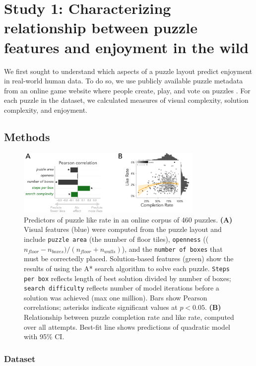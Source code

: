 \documentclass[10pt,letterpaper]{article}
\begin{document}
\section{Study 1: Characterizing relationship between puzzle features and enjoyment in the wild}
We first sought to understand which aspects of a puzzle layout predict enjoyment in real-world human data. To do so, we use publicly available puzzle metadata from an online game website where people create, play, and vote on puzzles \cite{sokobanonline}. For each puzzle in the dataset, we calculated measures of visual complexity, solution complexity, and enjoyment. 

\subsection{Methods}

\begin{figure}[ht]
    \centering
    \includegraphics[width=0.8\textwidth]{figures/fig3.pdf}
    \caption{Predictors of puzzle like rate in an online corpus of 460 puzzles. \textbf{(A)} Visual features (blue) were computed from the puzzle layout and include \texttt{puzzle area} (the number of floor tiles), \texttt{openness} (($n_{floor} - n_{boxes}) / (n_{floor} + n_{walls})$), and the \texttt{number of boxes} that must be correctedly placed. 
    Solution-based features (green) show the results of using the A* search algorithm to solve each puzzle. \texttt{Steps per box} reflects length of best solution divided by number of boxes; \texttt{search difficulty} reflects number of model iterations before a solution was achieved (max one million). Bars show Pearson correlations; asterisks indicate significant values at $p < 0.05$. \textbf{(B)} Relationship between puzzle completion rate and like rate, computed over all attempts. Best-fit line shows predictions of quadratic model with 95\% CI.}
    \label{fig:gleaning-figure}
\end{figure}



\subsubsection{Dataset}
\end{document}
